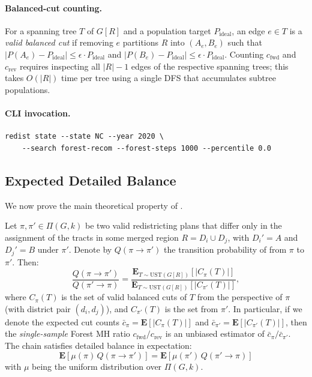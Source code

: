 \paragraph{Balanced-cut counting.}
For a spanning tree $T$ of $G[R]$ and a population target $P_{\mathrm{ideal}}$,
an edge $e \in T$ is a \emph{valid balanced cut} if removing $e$ partitions
$R$ into $(A_e, B_e)$ such that
$|P(A_e) - P_{\mathrm{ideal}}| \leq \epsilon \cdot P_{\mathrm{ideal}}$
and
$|P(B_e) - P_{\mathrm{ideal}}| \leq \epsilon \cdot P_{\mathrm{ideal}}$.
Counting $c_{\mathrm{fwd}}$ and $c_{\mathrm{rev}}$ requires inspecting all
$|R| - 1$ edges of the respective spanning trees; this takes $O(|R|)$ time
per tree using a single DFS that accumulates subtree populations.

\paragraph{CLI invocation.}
\begin{verbatim}
redist state --state NC --year 2020 \
    --search forest-recom --forest-steps 1000 --percentile 0.0
\end{verbatim}

\subsection{Expected Detailed Balance}

We now prove the main theoretical property of \fr{}.

\begin{theorem}
\label{thm:edb}
Let $\pi, \pi' \in \Pi(G, k)$ be two valid redistricting plans that differ
only in the assignment of the tracts in some merged region $R = D_i \cup D_j$,
with $D_i' = A$ and $D_j' = B$ under $\pi'$.
Denote by $Q(\pi \to \pi')$ the transition probability of \fr{} from $\pi$
to $\pi'$.
Then:
\[
  \frac{Q(\pi \to \pi')}{Q(\pi' \to \pi)}
  = \frac{\mathbf{E}_{T \sim \mathrm{UST}(G[R])}\!\left[|C_{\pi}(T)|\right]}
         {\mathbf{E}_{T \sim \mathrm{UST}(G[R])}\!\left[|C_{\pi'}(T)|\right]},
\]
where $C_{\pi}(T)$ is the set of valid balanced cuts of $T$ from the
perspective of $\pi$ (with district pair $(d_i, d_j)$), and $C_{\pi'}(T)$
is the set from $\pi'$.
In particular, if we denote the expected cut counts
$\bar{c}_\pi = \mathbf{E}[|C_{\pi}(T)|]$ and
$\bar{c}_{\pi'} = \mathbf{E}[|C_{\pi'}(T)|]$, then the \emph{single-sample}
Forest \recom{} MH ratio $c_{\mathrm{fwd}} / c_{\mathrm{rev}}$ is an
unbiased estimator of $\bar{c}_\pi / \bar{c}_{\pi'}$.
The chain satisfies detailed balance in expectation:
\[
  \mathbf{E}\!\left[\mu(\pi)\, Q(\pi \to \pi')\right]
  = \mathbf{E}\!\left[\mu(\pi')\, Q(\pi' \to \pi)\right]
\]
with $\mu$ being the uniform distribution over $\Pi(G,k)$.
\end{theorem}

